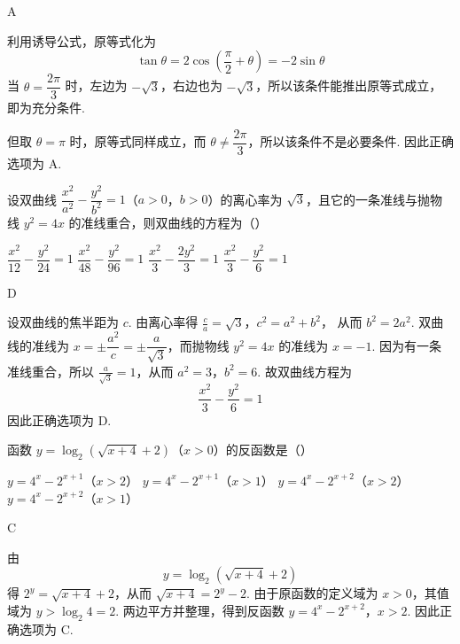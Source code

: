 \begin{answer}
A
\end{answer}

\begin{solution}
利用诱导公式，原等式化为
\[
\tan\theta=2\cos\left(\frac{\pi}{2}+\theta\right)=-2\sin\theta
\]
当 \(\theta=\dfrac{2\pi}{3}\) 时，左边为 \(-\sqrt{3}\)，右边也为 \(-\sqrt{3}\)，所以该条件能推出原等式成立，即为充分条件.

但取 \(\theta=\pi\) 时，原等式同样成立，而 \(\theta\ne\dfrac{2\pi}{3}\)，所以该条件不是必要条件. 因此正确选项为 A.
\end{solution}

\begin{problem}
设双曲线 \(\dfrac{x^2}{a^2} - \dfrac{y^2}{b^2} = 1\)（\(a > 0\)，\(b > 0\)）的离心率为 \(\sqrt{3}\)，且它的一条准线与抛物线 \(y^2 = 4x\) 的准线重合，则双曲线的方程为（\quad）

\choices
    {\(\dfrac{x^2}{12} - \dfrac{y^2}{24} = 1\)}
    {\(\dfrac{x^2}{48} - \dfrac{y^2}{96} = 1\)}
    {\(\dfrac{x^2}{3} - \dfrac{2y^2}{3} = 1\)}
    {\(\dfrac{x^2}{3} - \dfrac{y^2}{6} = 1\)}
\end{problem}

\begin{answer}
D
\end{answer}

\begin{solution}
设双曲线的焦半距为 \(c\). 由离心率得
\(\frac{c}{a}=\sqrt{3}\)，\(c^2=a^2+b^2\)，
从而 \(b^2=2a^2\). 双曲线的准线为 \(x=\pm\dfrac{a^2}{c}=\pm\dfrac{a}{\sqrt{3}}\)，而抛物线 \(y^2=4x\) 的准线为 \(x=-1\). 因为有一条准线重合，所以
\(\frac{a}{\sqrt{3}}=1\)，从而 \(a^2=3\)，\(b^2=6\).
故双曲线方程为
\[
\frac{x^2}{3}-\frac{y^2}{6}=1
\]
因此正确选项为 D.
\end{solution}

\begin{problem}
函数 \(y = \log_2\left(\sqrt{x + 4} + 2\right)\)（\(x > 0\)）的反函数是（\quad）

\choices
    {\(y = 4^{x} - 2^{x + 1}\)（\(x > 2\)）}
    {\(y = 4^{x} - 2^{x + 1}\)（\(x > 1\)）}
    {\(y = 4^{x} - 2^{x + 2}\)（\(x > 2\)）}
    {\(y = 4^{x} - 2^{x + 2}\)（\(x > 1\)）}
\end{problem}

\begin{answer}
C
\end{answer}

\begin{solution}
由
\[
y=\log_2\left(\sqrt{x+4}+2\right)
\]
得 \(2^y=\sqrt{x+4}+2\)，从而 \(\sqrt{x+4}=2^y-2\).
由于原函数的定义域为 \(x>0\)，其值域为 \(y>\log_2 4=2\). 两边平方并整理，得到反函数
\(y=4^x-2^{x+2}\)，\(x>2\).
因此正确选项为 C.
\end{solution}

